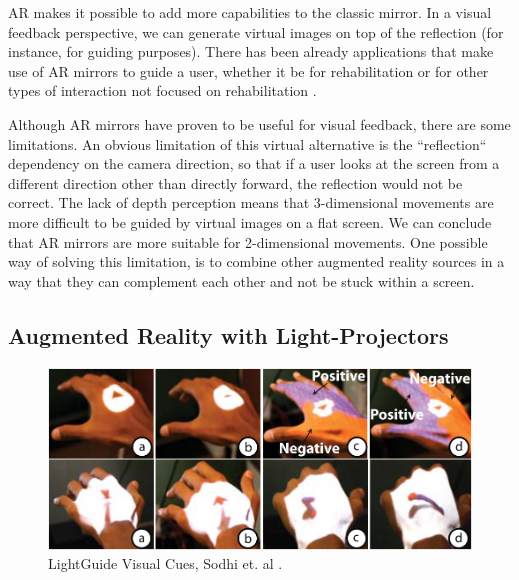 %

\ac{AR} makes it possible to add more capabilities to the classic mirror. 
In a visual feedback perspective, we can generate virtual images on top of the reflection (for instance, for guiding purposes). 
There has been already applications that make use of \ac{AR} mirrors to guide a user, whether it be for rehabilitation \cite{Tang2014a,Velloso2013,Klein2013} or for other types of interaction not focused on rehabilitation \cite{Alhamid2012a,blum2012}.

Although \ac{AR} mirrors have proven to be useful for visual feedback, there are some limitations. 
An obvious limitation of this virtual alternative is the ``reflection`` dependency on the camera direction, 
so that if a user looks at the screen from a different direction
other than directly forward, the reflection would not be correct.
The lack of depth perception means that 3-dimensional movements are more difficult to be guided by virtual images on a flat screen. 
We can conclude that \ac{AR} mirrors are more suitable for 2-dimensional movements. One possible way of solving this limitation, 
is to combine other augmented reality sources in a way that they can complement each other and not be stuck within a screen.


\subsection{Augmented Reality with Light-Projectors}
\label{RW-projectionmapping}


\begin{figure}[!t]
    \begin{center}
        \includegraphics[width=\textwidth]{imgs/lightguide}
    \end{center}
    \caption{LightGuide Visual Cues, Sodhi et. al \cite{Sodhi2012}.}
    \label{fig:lightguide}
\end{figure}


